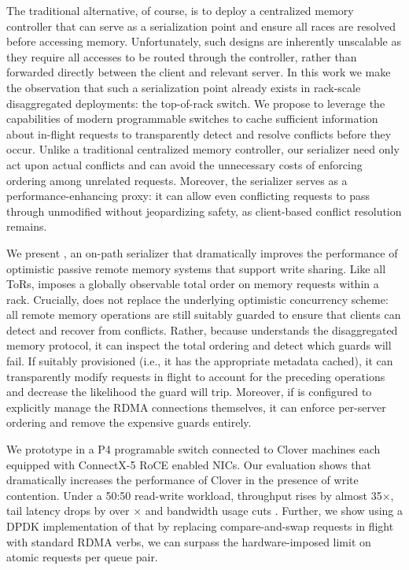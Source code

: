 The traditional alternative, of course, is to deploy a centralized
memory controller that can serve as a serialization point and ensure
all races are resolved before accessing memory.  Unfortunately, such
designs are inherently unscalable as they require all accesses to be
routed through the controller, rather than forwarded directly between
the client and relevant server.  In this work we make the observation
that such a serialization point already exists in rack-scale
disaggregated deployments: the top-of-rack switch.  We propose to
leverage the capabilities of modern programmable switches to cache
sufficient information about in-flight requests to transparently
detect and resolve conflicts before they occur.  Unlike a traditional
centralized memory controller, our serializer need only act upon
actual conflicts and can avoid the unnecessary costs of enforcing
ordering among unrelated requests.  Moreover, the
serializer serves as a performance-enhancing proxy: it can 
allow even conflicting requests to pass through unmodified without
jeopardizing safety, as client-based conflict resolution remains.

We present {\sword}, an on-path serializer
that dramatically improves the performance of optimistic passive
remote memory systems that support write sharing.  Like all ToRs,
{\sword} imposes a globally observable total order on memory
requests within a rack.  Crucially, {\sword} does not replace the
underlying optimistic concurrency scheme: all remote memory operations
are still suitably guarded to ensure that clients can detect and
recover from conflicts.  Rather, because {\sword} understands the
disaggregated memory protocol, it can inspect the total ordering and
detect which guards will fail.  If suitably provisioned (i.e., it has
the appropriate metadata cached), it can transparently modify requests
in flight to account for the preceding operations and decrease the
likelihood the guard will trip.  Moreover, if {\sword} is configured
to explicitly manage the RDMA connections themselves, it can enforce
per-server ordering and remove the expensive guards entirely.

We prototype {\sword} in a P4 programable switch connected to Clover machines
each equipped with ConnectX-5 RoCE enabled NICs. Our evaluation shows that
{\sword} dramatically increases the performance of Clover in the presence of
write contention. Under a 50:50 read-write workload, throughput rises by almost
35$\times$, tail latency drops by over $\times$ and bandwidth usage
cuts .  Further, we show using a DPDK implementation of
{\sword} that by replacing compare-and-swap requests in flight with standard RDMA
verbs, we can surpass the hardware-imposed limit on atomic requests per queue
pair.

